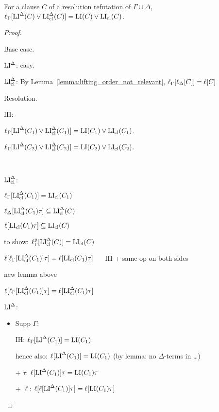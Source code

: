 \documentclass[,%
	draft=false,%
	numbers=noendperiod
	11pt,
	a4paper,
	oneside,%
	openany,
]{memoir}
\begin{document}
\begin{lemma}
	\label{lemma:gamma_lifted_lide}
	For a clause $C$ of a resolution refutation of $\Gamma\cup\Delta$, 
	$\lifgammanovar{\LIde(C) \lor \LIclde(C)} = \LI(C) \lor \LIcl(C)$.
\end{lemma}
\begin{proof}
	\begin{description}
		\item{} Base case.

			$\LIde$: easy.

			$\LIclde$:
			By Lemma~\ref{lemma:lifting_order_not_relevant}, $\lifgammanovar{\lifdeltanovar{C}} = \lifboth{C}$

		\item{} Resolution.

			IH: 

			$\lifgammanovar{\LIde(C_1) \lor \LIclde(C_1)} = \LI(C_1) \lor \LIcl(C_1)$.

			$\lifgammanovar{\LIde(C_2) \lor \LIclde(C_2)} = \LI(C_2) \lor \LIcl(C_2)$.

			~

			$\LIclde$:

			$\lifgammanovar{\LIclde(C_1)} = \LIcl(C_1)$

			$\lifdeltanovar{\LIclde(C_1)\tau} \subseteq \LIclde(C)$ 


			$\lifboth{\LIcl(C_1)\tau} \subseteq \LIcl(C)$

			to show: $\lifgamma{ \LIclde( C)} = \LIcl(C)$

			$ \lifboth{ \lifgammanovar{\LIclde(C_1)} \tau} = \lifboth{ \LIcl(C_1)\tau}$ $\quad$ IH + same op on both sides

			new lemma above

			$ \lifboth{ \lifgammanovar{\LIclde(C_1)} \tau} = 
			\lifboth{ \LIclde(C_1) \tau} $
			~

			$\LIde$:

			\begin{itemize}
				\item Supp $\Gamma$:

					IH: $\lifgammanovar{ \LIde(C_1) } = \LI(C_1)$

					hence also: $\lifboth{ \LIde(C_1) } = \LI(C_1)$ (by lemma: no $\Delta$-terms in \dots)

					+ $\tau$:
					$\lifboth{ \LIde(C_1) }\tau = \LI(C_1)\tau$ 

					+ $\ell$:
					$\lifboth{\lifboth{ \LIde(C_1) }\tau} = \lifboth{\LI(C_1)\tau}$ 


\end{itemize}
\end{description}
\end{proof}
\end{document}
